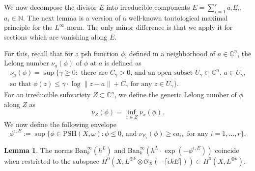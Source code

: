 \documentclass[12pt]{article}
\numberwithin{equation}{section}
\theoremstyle{theorem}
\theoremstyle{definition}
\newtheorem{lem}[thm]{Lemma}
\theoremstyle{remark}
\newcommand{\comp}{\mathbb{C}}
\newcommand{\nat}{\mathbb{N}}
\begin{document}

	We now decompose the divisor $E$ into irreducible components $E = \sum_{i = 1}^{r} a_i E_i$, $a_i \in \nat$. 
	The next lemma is a version of a well-known tautological maximal principle for the $L^{\infty}$-norm.
	The only minor difference is that we apply it for sections which are vanishing along $E$.
	\par 
	For this, recall that for a psh function $\phi$, defined in a neighborhood of $a \in \comp^n$, the Lelong number $\nu_a(\phi)$ of $\phi$ at $a$ is defined as 
	\begin{multline}
		\nu_a(\phi) = \sup \Big\{ \gamma \geq 0 : \text{ there are $C_{\gamma} > 0$, and an open subset $U_{\gamma} \subset \comp^n$, $a \in U_{\gamma}$,} \\ \text{so that } \phi(z) \leq \gamma \cdot \log \|z - a\| + C_{\gamma} \text{ for any } z \in U_{\gamma} \Big\}.
	\end{multline}
	For an irreducible subvariety $Z \subset \comp^n$, we define the generic Lelong number of $\phi$ along $Z$ as 
	\begin{equation}
		\nu_Z(\phi) = \inf_{x \in Z} \nu_x(\phi).
	\end{equation}
	We now define the following envelope
	\begin{equation}\label{eq_env_lelong}
		\phi^{\epsilon, E} := \sup \Big\{ \phi \in {\textrm{PSH}}(X, \omega) : \phi \leq 0 \text{, and } \nu_{E_i}(\phi) \geq \epsilon a_i, \text{ for any $i = 1, \ldots, r$} \Big\}.
	\end{equation}
	\begin{lem}\label{lem_max_principl}
		The norms ${\textrm{Ban}}_k^{\infty}(h^L)$ and ${\textrm{Ban}}_k^{\infty}(h^L \cdot \exp(-\phi^{\epsilon, E}))$ coincide when restricted to the subspace $H^0(X, L^{\otimes k} \otimes \mathscr{O}_X(- \lceil \epsilon k E \rceil)) \subset H^0(X, L^{\otimes k})$.
	\end{lem}
\end{document}

